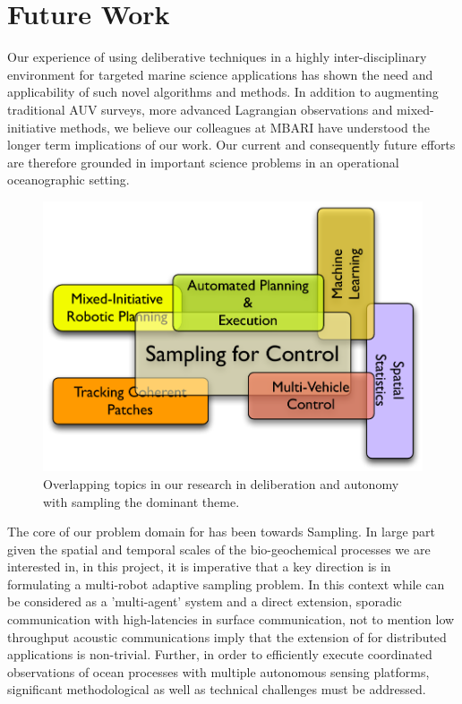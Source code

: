 \section{Future Work}
\label{sec:future}

Our experience of using deliberative techniques in a highly
inter-disciplinary environment for targeted marine science
applications has shown the need and applicability of such novel
algorithms and methods. In addition to augmenting traditional AUV
surveys, more advanced Lagrangian observations and mixed-initiative
methods, we believe our colleagues at MBARI have understood the longer
term implications of our work. Our current and consequently future
efforts are therefore grounded in important science problems in an
operational oceanographic setting.

\begin{figure}[h]
  \centering
  \includegraphics[scale=0.45]{figs/autonomy-topics.pdf}
  \caption{\small Overlapping topics in our research in deliberation
    and autonomy with sampling the dominant theme.}
  \label{fig:topics}
\end{figure}

The core of our problem domain for \can has been towards Sampling. In
large part given the spatial and temporal scales of the
bio-geochemical processes we are interested in, in this project, it is
imperative that a key direction is in formulating a multi-robot
adaptive sampling problem. In this context while \rx can be considered
as a 'multi-agent' system and  a direct extension, sporadic
communication with high-latencies in surface communication, not to
mention low throughput acoustic communications imply that the
extension of \rx for distributed applications is non-trivial. Further,
in order to efficiently execute coordinated observations of ocean
processes with multiple autonomous sensing platforms, significant
methodological as well as technical challenges must be
addressed. 


